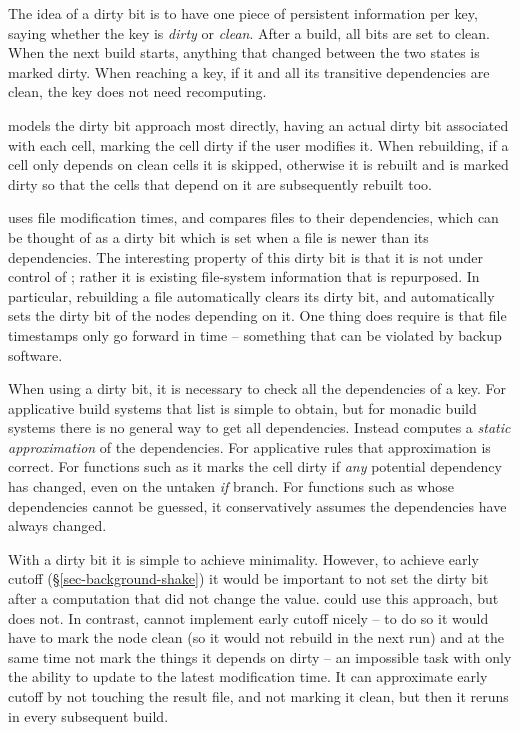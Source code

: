 The idea of a dirty bit is to have one piece of persistent
information per key, saying whether the key is
\emph{dirty} or \emph{clean}. After a build, all bits are set to clean. When the
next build starts, anything that changed between the two states is marked
dirty.
When reaching a key, if it and all its transitive dependencies are clean, the
key does not need recomputing.

\Excel models the dirty bit approach most directly, having an actual dirty bit
associated with each cell, marking the cell dirty if the user modifies it.
When rebuilding, if a cell only depends on clean cells it is skipped, otherwise
it is rebuilt and is marked dirty so that the cells that depend on it are
subsequently rebuilt too.


\Make uses file modification times, and compares files to their
dependencies, which can be thought of as a dirty bit which is set when
a file is newer than its dependencies. The interesting property of
this dirty bit is that it is not under control of \Make; rather it is
existing file-system information that is repurposed. In particular,
rebuilding a file automatically clears its dirty bit, and
automatically sets the dirty bit of the nodes depending on it. One
thing \Make does require is that file timestamps only go forward in
time -- something that can be violated by backup software.

When using a dirty bit, it is necessary to check all the dependencies of a key. For applicative build systems that list is simple to obtain, but for monadic build systems there is no general way to get all dependencies. Instead \Excel computes a \emph{static approximation} of the dependencies. For applicative rules that approximation is correct. For functions such as  it marks the cell dirty if \emph{any} potential dependency has changed, even on the untaken \emph{if} branch. For functions such as  whose dependencies cannot be guessed, it conservatively assumes the dependencies have always changed.

With a dirty bit it is simple to achieve minimality. However, to achieve early cutoff
(\S\ref{sec-background-shake}) it would be important to not set the dirty bit
after a computation that did not change the value. \Excel could use this
approach, but does not. In contrast, \Make cannot implement early cutoff nicely -- to
do so it would have to mark the node clean (so it would not rebuild in the next
run) and at the same time not mark the things it depends on dirty -- an
impossible task with only the ability to update to the latest modification time.
It can approximate early cutoff by not touching the result file, and not marking it clean,
but then it reruns in every subsequent build.

